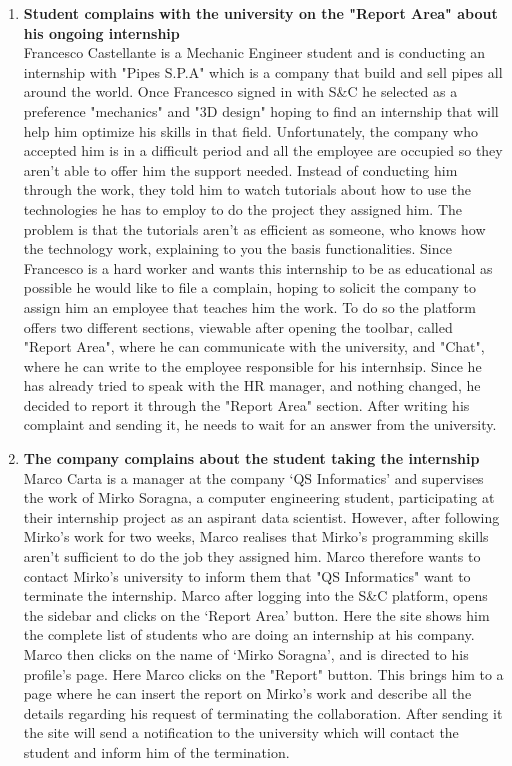 \begin{enumerate}
      \item \textbf{Student complains with the university on the "Report Area" about his ongoing internship}\\
      Francesco Castellante is a Mechanic Engineer student and is conducting an internship with "Pipes S.P.A" which is a company that build and sell pipes all around the world. Once Francesco signed in with S\&C he selected as a preference "mechanics" and "3D design" hoping to find an internship that will help him optimize his skills in that field. Unfortunately, the company who accepted him is in a difficult period and all the employee are occupied so they aren't able to offer him the support needed. Instead of conducting him through the work, they told him to watch tutorials about how to use the technologies he has to employ to do the project they assigned him. The problem is that the tutorials aren't as efficient as someone, who knows how the technology work, explaining to you the basis functionalities. Since Francesco is a hard worker and wants this internship to be as educational as possible he would like to file a complain, hoping to solicit the company to assign him an employee that teaches him the work. To do so the platform offers two different sections, viewable after opening the toolbar, called "Report Area", where he can communicate with the university, and "Chat", where he can write to the employee responsible for his internhsip. Since he has already tried to speak with the HR manager, and nothing changed, he decided to report it through the "Report Area" section. After writing his complaint and sending it, he needs to wait for an answer from the university.
      
      \item \textbf{The company complains about the student taking the internship}\\
      Marco Carta is a manager at the company ‘QS Informatics’ and supervises the work of Mirko Soragna, a computer engineering student, participating at their internship project as an aspirant data scientist. However, after following Mirko's work for two weeks, Marco realises that Mirko's programming skills aren't sufficient to do the job they assigned him. Marco therefore wants to contact Mirko's university to inform them that "QS Informatics" want to terminate the internship. Marco after logging into the S\&C platform, opens the sidebar and clicks on the ‘Report Area’ button. Here the site shows him the complete list of students who are doing an internship at his company. Marco then clicks on the name of ‘Mirko Soragna’, and is directed to his profile's page. Here Marco clicks on the "Report" button. This brings him to a page where he can insert the report on Mirko's work and describe all the details regarding his request of terminating the collaboration. After sending it the site will send a notification to the university which will contact the student and inform him of the termination.
      
\end{enumerate}

